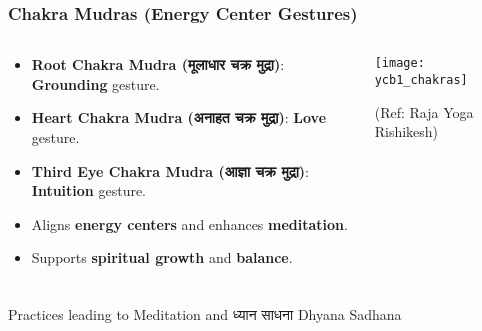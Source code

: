 \begin{frame}[fragile]\frametitle{Chakra Mudras (Energy Center Gestures)}
\begin{columns}
    \begin{column}[T]{0.5\linewidth}
      \begin{itemize}
        \item \textbf{Root Chakra Mudra (मूलाधार चक्र मुद्रा)}: \textbf{Grounding} gesture.
        \item \textbf{Heart Chakra Mudra (अनाहत चक्र मुद्रा)}: \textbf{Love} gesture.
        \item \textbf{Third Eye Chakra Mudra (आज्ञा चक्र मुद्रा)}: \textbf{Intuition} gesture.
        \item Aligns \textbf{energy centers} and enhances \textbf{meditation}.
        \item Supports \textbf{spiritual growth} and \textbf{balance}.
      \end{itemize}
    \end{column}
    \begin{column}[T]{0.5\linewidth}
        \begin{center}
        \texttt{[image: ycb1\_chakras]}
				
		{\tiny (Ref: Raja Yoga Rishikesh)}	 
        \end{center}	
    \end{column}
\end{columns}
\end{frame}



\begin{frame}[fragile]\frametitle{}
\begin{center}
{\Large Practices leading to Meditation and ध्यान साधना  Dhyana Sadhana }
\end{center}
\end{frame}

